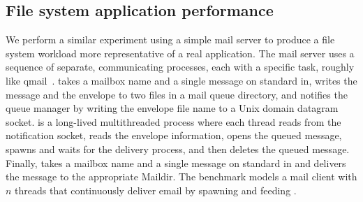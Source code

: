 \begin{comment}
The application could perform the name lookup once by a setting up a
stream socket at the beginning, and then using \code{send} to
communicate.  This setup results in better scalability (see the line
labeled ``Linux with $n$ streams''). But, in this setup, a spin
lock in the scheduler becomes a bottleneck (\XXX[FK]{double check}).
Clearly, Linux developers could remove these bottlenecks.  What is nice
about our approach is that the commutativity rule makes clear that these
locks can be removed and that \tool{} can catch these non-scalable
invocations that should be scalable.  \XXX[FK]{We should mention
somewhere that we have a model for unordered and ordered sockets.}

\begin{figure}
  \centering
  
  \caption{Scalability of $n$ clients concurrently sending and receiving 1
    byte messages to/from $n$ server  processes.}
  \label{fig:sockbench}
\end{figure}
\end{comment}


\subsection{File system application performance}
\label{sec:eval:app}

We perform a similar experiment using a simple mail server to
produce a file system workload more representative of a real
application.  The mail server uses a sequence of separate, communicating
processes, each with a specific task, roughly like qmail~\cite{qmail}.
 takes a mailbox name and a single message on
standard in, writes the message and the envelope to two files in a
mail queue directory, and notifies the queue manager by writing the
envelope file
name to a Unix domain datagram socket.   is a long-lived
multithreaded process where each thread reads from the notification
socket, reads the envelope information, opens the queued message, spawns
and waits for the delivery process, and then deletes the queued message.
Finally,  takes a mailbox name and a single message
on standard in and delivers the message to the appropriate Maildir.
The benchmark models a mail client with $n$ threads that continuously
deliver email by spawning and feeding .

